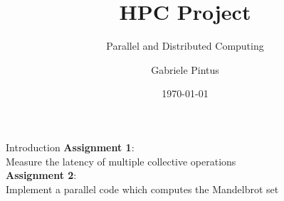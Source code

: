 \documentclass[10pt]{beamer}
\title{HPC Project}
\subtitle{Parallel and Distributed Computing}
\date{\today}
\author{Gabriele Pintus}
\institute{University of Trieste}
\begin{document}
\maketitle

\begin{frame}[fragile]{Introduction}
  \textbf{Assignment 1}: \\
  Measure the latency of multiple collective operations \\
  \textbf{Assignment 2}: \\
  Implement a parallel code which computes the Mandelbrot set
\end{frame}




\end{document}
